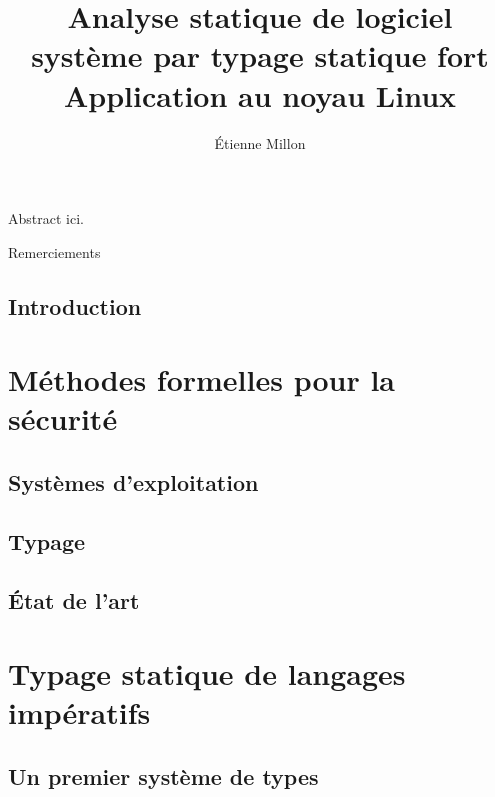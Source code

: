 \documentclass[a4paper,11pt]{memoir}
\title{ \bfseries\LARGE Analyse statique de logiciel système par typage statique fort\\%
      {\mdseries\Large Application au noyau Linux}}
\author{Étienne Millon}
\begin{document}
\frontmatter

\maketitle

\cleartorecto

\asuabstract

Abstract ici.

\asuacknowledgements

Remerciements


\tableofcontents

\mainmatter

\chapter{Introduction}


\part{Méthodes formelles pour la sécurité}

\chapter{Systèmes d'exploitation}

\label{cha:os}


\chapter{Typage}



\chapter{État de l'art}



\part{Typage statique de langages impératifs}

\chapter{Un premier système de types}
\end{document}
